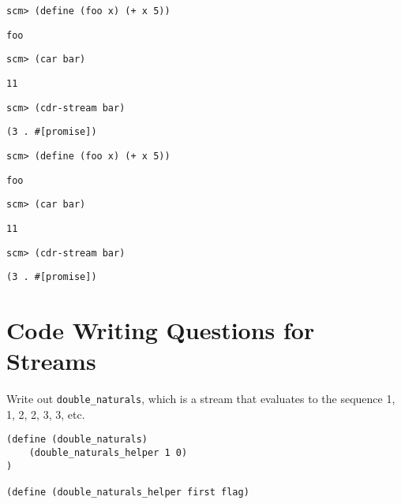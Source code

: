 \documentclass{exam}
\begin{document}
\begin{questions}
\begin{blocksection}
\begin{lstlisting}
scm> (define (foo x) (+ x 5))
\end{lstlisting}
\begin{solution}[.25in]
\texttt{foo}
\end{solution}

\begin{lstlisting}
scm> (car bar)
\end{lstlisting}
\begin{solution}[.25in]
\texttt{11}
\end{solution}

\begin{lstlisting}
scm> (cdr-stream bar)
\end{lstlisting}
\begin{solution}[.25in]
\texttt{(3 . #[promise])}
\end{solution}

\begin{lstlisting}
scm> (define (foo x) (+ x 5))
\end{lstlisting}
\begin{solution}[.25in]
\texttt{foo}
\end{solution}

\begin{lstlisting}
scm> (car bar)
\end{lstlisting}
\begin{solution}[.25in]
\texttt{11}
\end{solution}

\begin{lstlisting}
scm> (cdr-stream bar)
\end{lstlisting}
\begin{solution}[.25in]
\texttt{(3 . #[promise])}
\end{solution}
\end{blocksection}

\section{Code Writing Questions for Streams}

\begin{blocksection}
\question Write out \texttt{double_naturals}, which is a stream that evaluates to the sequence 1, 1, 2, 2, 3, 3, etc.
\begin{lstlisting}
(define (double_naturals)
    (double_naturals_helper 1 0)
)

(define (double_naturals_helper first flag)





\end{lstlisting}
\end{blocksection}
\end{questions}
\end{document}
